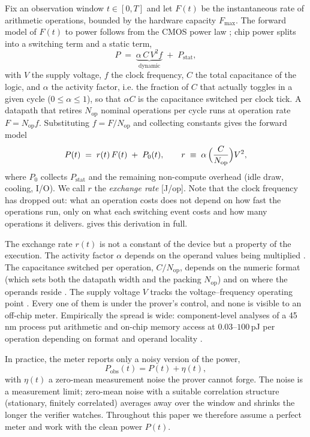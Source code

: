 \documentclass{article}
\theoremstyle{plain}
\theoremstyle{definition}
\theoremstyle{remark}
\begin{document}
Fix an observation window $t \in [0,T]$ and let $F(t)$ be the instantaneous
rate of arithmetic operations, bounded by the hardware capacity
$F_{\max}$. The forward model of $F(t)$ to power follows from the CMOS power law
\citep{chandrakasan1992lowpower}; chip power splits into a switching term and
a static term,
\begin{equation}
	P \;=\; \underbrace{\alpha\,C\,V^2 f}_{\text{dynamic}} \;+\; P_{\mathrm{stat}},
	\label{eq:cmoslaw}
\end{equation}
with $V$ the supply voltage, $f$ the clock frequency, $C$ the total capacitance of
the logic, and $\alpha$ the activity factor, i.e. the fraction of $C$ that
actually toggles in a given cycle ($0 \le \alpha \le 1$), so that
$\alpha C$ is the capacitance switched per clock tick. A datapath that retires $N_{\mathrm{op}}$
nominal operations per cycle runs at operation rate $F = N_{\mathrm{op}}f$.
Substituting $f = F/N_{\mathrm{op}}$ and collecting constants gives the
forward model
\begin{equation}
	P(t) \;=\; r(t)\,F(t) \;+\; P_0(t), \qquad
	r \;\equiv\; \alpha\,\Bigl(\frac{C}{N_{\mathrm{op}}}\Bigr) V^2 ,
	\label{eq:forward}
\end{equation}
where $P_0$ collects $P_{\mathrm{stat}}$ and the remaining non-compute
overhead (idle draw, cooling, I/O). We call $r$ the \emph{exchange rate}
[J/op]. Note that the clock frequency
has dropped out: what an operation costs does not depend on
how fast the operations run, only on what each switching event costs and how
many operations it delivers.  gives this derivation in full.

The exchange rate $r(t)$ is not a constant of the device but a property of the
execution. The activity factor $\alpha$ depends on the operand values being
multiplied \citep{chandrakasan1992lowpower}. The capacitance switched per operation,
$C/N_{\mathrm{op}}$, depends on the numeric format (which sets both the
datapath width and the packing $N_{\mathrm{op}}$) and on where the operands
reside \citep{horowitz2014computing}. The supply voltage $V$ tracks the
voltage--frequency operating point \citep{pallipadi2006ondemand}. Every one
of them is under the prover's control, and none is visible to an off-chip
meter. Empirically the spread is wide: component-level analyses of a 45\,nm
process put arithmetic and on-chip memory access at $0.03$--$100$\,pJ per
operation depending on format and operand locality
\citep{horowitz2014computing}. 

In practice, the meter reports only a noisy version of the power,
\begin{equation}
	P_{\mathrm{obs}}(t) = P(t) + \eta(t),
	\label{eq:obs}
\end{equation}
with $\eta(t)$ a zero-mean measurement noise the prover cannot forge. The
noise is a measurement limit; zero-mean noise with a suitable correlation
structure (stationary, finitely correlated) averages away over
the window and shrinks the longer the verifier watches. Throughout this paper
we therefore assume a perfect meter and work with the clean power $P(t)$.
\end{document}
